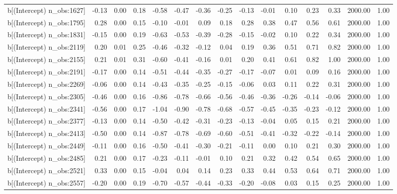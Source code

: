 \begin{table}[ht]
\begin{tabular}{rrrrrrrrrrrrrrr}
  b[(Intercept) n\_obs:1627] & -0.13 & 0.00 & 0.18 & -0.58 & -0.47 & -0.36 & -0.25 & -0.13 & -0.01 & 0.10 & 0.23 & 0.33 & 2000.00 & 1.00 \\ 
  b[(Intercept) n\_obs:1795] & 0.28 & 0.00 & 0.15 & -0.10 & -0.01 & 0.09 & 0.18 & 0.28 & 0.38 & 0.47 & 0.56 & 0.61 & 2000.00 & 1.00 \\ 
  b[(Intercept) n\_obs:1831] & -0.15 & 0.00 & 0.19 & -0.63 & -0.53 & -0.39 & -0.28 & -0.15 & -0.02 & 0.10 & 0.22 & 0.34 & 2000.00 & 1.00 \\ 
  b[(Intercept) n\_obs:2119] & 0.20 & 0.01 & 0.25 & -0.46 & -0.32 & -0.12 & 0.04 & 0.19 & 0.36 & 0.51 & 0.71 & 0.82 & 2000.00 & 1.00 \\ 
  b[(Intercept) n\_obs:2155] & 0.21 & 0.01 & 0.31 & -0.60 & -0.41 & -0.16 & 0.01 & 0.20 & 0.41 & 0.61 & 0.82 & 1.00 & 2000.00 & 1.00 \\ 
  b[(Intercept) n\_obs:2191] & -0.17 & 0.00 & 0.14 & -0.51 & -0.44 & -0.35 & -0.27 & -0.17 & -0.07 & 0.01 & 0.09 & 0.16 & 2000.00 & 1.00 \\ 
  b[(Intercept) n\_obs:2269] & -0.06 & 0.00 & 0.14 & -0.43 & -0.35 & -0.25 & -0.15 & -0.06 & 0.03 & 0.11 & 0.22 & 0.31 & 2000.00 & 1.00 \\ 
  b[(Intercept) n\_obs:2305] & -0.46 & 0.00 & 0.16 & -0.86 & -0.78 & -0.66 & -0.56 & -0.46 & -0.36 & -0.26 & -0.14 & -0.06 & 2000.00 & 1.00 \\ 
  b[(Intercept) n\_obs:2341] & -0.56 & 0.00 & 0.17 & -1.04 & -0.90 & -0.78 & -0.68 & -0.57 & -0.45 & -0.35 & -0.23 & -0.12 & 2000.00 & 1.00 \\ 
  b[(Intercept) n\_obs:2377] & -0.13 & 0.00 & 0.14 & -0.50 & -0.42 & -0.31 & -0.23 & -0.13 & -0.04 & 0.05 & 0.15 & 0.21 & 2000.00 & 1.00 \\ 
  b[(Intercept) n\_obs:2413] & -0.50 & 0.00 & 0.14 & -0.87 & -0.78 & -0.69 & -0.60 & -0.51 & -0.41 & -0.32 & -0.22 & -0.14 & 2000.00 & 1.00 \\ 
  b[(Intercept) n\_obs:2449] & -0.11 & 0.00 & 0.16 & -0.50 & -0.41 & -0.30 & -0.21 & -0.11 & 0.00 & 0.10 & 0.21 & 0.30 & 2000.00 & 1.00 \\ 
  b[(Intercept) n\_obs:2485] & 0.21 & 0.00 & 0.17 & -0.23 & -0.11 & -0.01 & 0.10 & 0.21 & 0.32 & 0.42 & 0.54 & 0.65 & 2000.00 & 1.00 \\ 
  b[(Intercept) n\_obs:2521] & 0.33 & 0.00 & 0.15 & -0.04 & 0.04 & 0.14 & 0.23 & 0.33 & 0.44 & 0.53 & 0.64 & 0.71 & 2000.00 & 1.00 \\ 
  b[(Intercept) n\_obs:2557] & -0.20 & 0.00 & 0.19 & -0.70 & -0.57 & -0.44 & -0.33 & -0.20 & -0.08 & 0.03 & 0.15 & 0.25 & 2000.00 & 1.00 \\ 

\end{tabular}
\end{table}
